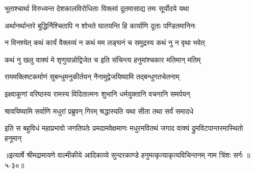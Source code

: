 \twolineshloka
{भूताश्चार्था विरुध्यन्त देशकालविरोधिताः}
{विक्लवं दूतमासाद्य तमः सूर्योदये यथा} %

\twolineshloka
{अर्थानर्थान्तरे बुद्धिर्निश्चितापि न शोभते}
{घातयन्ति हि कार्याणि दूताः पण्डितमानिनः} %

\twolineshloka
{न विनश्येत् कथं कार्यं वैक्लव्यं न कथं मम}
{लङ्घनं च समुद्रस्य कथं नु न वृथा भवेत्} %

\twolineshloka
{कथं नु खलु वाक्यं मे शृणुयान्नोद्विजेत च}
{इति संचिन्त्य हनुमांश्चकार मतिमान् मतिम्} %

\twolineshloka
{राममक्लिष्टकर्माणं सुबन्धुमनुकीर्तयन्}
{नैनामुद्वेजयिष्यामि तद्बन्धुगतचेतनाम्} %

\twolineshloka
{इक्ष्वाकूणां वरिष्ठस्य रामस्य विदितात्मनः}
{शुभानि धर्मयुक्तानि वचनानि समर्पयन्} %

\twolineshloka
{श्रावयिष्यामि सर्वाणि मधुरां प्रब्रुवन् गिरम्}
{श्रद्धास्यति यथा सीता तथा सर्वं समादधे} %

\twolineshloka
{इति स बहुविधं महाप्रभावो जगतिपतेः प्रमदामवेक्षमाणः}
{मधुरमवितथं जगाद वाक्यं द्रुमविटपान्तरमास्थितो हनूमान्} %


॥इत्यार्षे श्रीमद्रामायणे वाल्मीकीये आदिकाव्ये सुन्दरकाण्डे हनुमत्कृत्याकृत्यविचिन्तनम् नाम त्रिंशः सर्गः ॥५-३०॥
